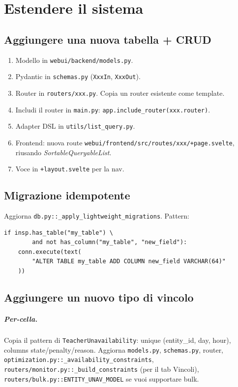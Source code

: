 \chapter{Estendere il sistema}

\section{Aggiungere una nuova tabella + CRUD}

\begin{enumerate}
  \item Modello in \texttt{webui/backend/models.py}.
  \item Pydantic in \texttt{schemas.py} (\texttt{XxxIn}, \texttt{XxxOut}).
  \item Router in \texttt{routers/xxx.py}. Copia un router esistente
        come template.
  \item Includi il router in \texttt{main.py}:
        \texttt{app.include\_router(xxx.router)}.
  \item Adapter DSL in \texttt{utils/list\_query.py}.
  \item Frontend: nuova route
        \texttt{webui/frontend/src/routes/xxx/+page.svelte},
        riusando \emph{SortableQueryableList}.
  \item Voce in \texttt{+layout.svelte} per la nav.
\end{enumerate}

\section{Migrazione idempotente}

Aggiorna \texttt{db.py::\_apply\_lightweight\_migrations}. Pattern:

\begin{lstlisting}[style=py]
if insp.has_table("my_table") \
        and not has_column("my_table", "new_field"):
    conn.execute(text(
        "ALTER TABLE my_table ADD COLUMN new_field VARCHAR(64)"
    ))
\end{lstlisting}

\section{Aggiungere un nuovo tipo di vincolo}

\paragraph{Per-cella.} Copia il pattern di
\texttt{TeacherUnavailability}: unique (entity\_id, day, hour),
columns state/penalty/reason. Aggiorna \texttt{models.py},
\texttt{schemas.py}, router, \texttt{optimization.py::\_availability\_constraints},
\texttt{routers/monitor.py::\_build\_constraints} (per il tab
Vincoli), \texttt{routers/bulk.py::ENTITY\_UNAV\_MODEL} se vuoi
supportare bulk.

